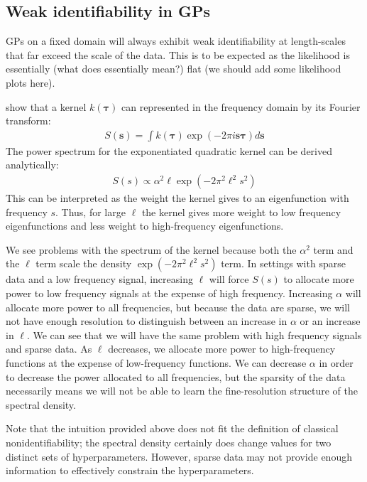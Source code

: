 \documentclass{article}
\begin{document}
\subsection{Weak identifiability in GPs}

GPs on a fixed domain will always exhibit weak identifiability 
at length-scales that far exceed the scale of the data. This is
to be expected as the likelihood is essentially (what does essentially
mean?) flat (we should add some likelihood plots here). 

\citet{rasmussen2005gaussian} show that a kernel $k(\boldsymbol{\tau})$ can
represented in the frequency domain by its Fourier transform:
\begin{align*}
  S(\mathbf{s}) = \int k(\mathbf{\tau}) \exp \left( -2 \pi i \mathbf{s}  \boldsymbol{\tau} \right) d\mathbf{s}
\end{align*}
The power spectrum for the exponentiated quadratic kernel can be derived analytically:
\begin{align*} 
  S(s) \propto \alpha^2 \ell
   \exp \left(
  - 2 \pi^2 \ell^2 s^2
\right)
\end{align*} 
This can be interpreted as the weight the kernel gives to an eigenfunction with
frequency $s$. Thus, for large $\ell$ the kernel gives more weight to low
frequency eigenfunctions and less weight to high-frequency eigenfunctions. 

We see problems with the spectrum of the kernel because both the $\alpha ^ 2$
term and the $\ell$ term scale the density $\exp \left(- 2 \pi^2 \ell^2 s^2
\right)$ term. In settings with sparse data and a low frequency signal,
increasing $\ell$ will force $S(s)$ to allocate more power to low frequency
signals at the expense of high frequency. Increasing $\alpha$ will allocate
more power to all frequencies, but because the data are sparse, we will not
have enough resolution to distinguish between an increase in $\alpha$ or an
increase in $\ell$. We can see that we will have the same problem with high
frequency signals and sparse data. As $\ell$ decreases, we allocate more power
to high-frequency functions at the expense of low-frequency functions. We can
decrease $\alpha$ in order to decrease the power allocated to all frequencies,
but the sparsity of the data necessarily means we will not be able to learn the
fine-resolution structure of the spectral density.

Note that the intuition provided above does not fit the definition of 
classical nonidentifiability; the spectral density certainly does change
values for two distinct sets of hyperparameters. However, sparse data
may not provide enough information to effectively constrain the hyperparameters.
\end{document}
